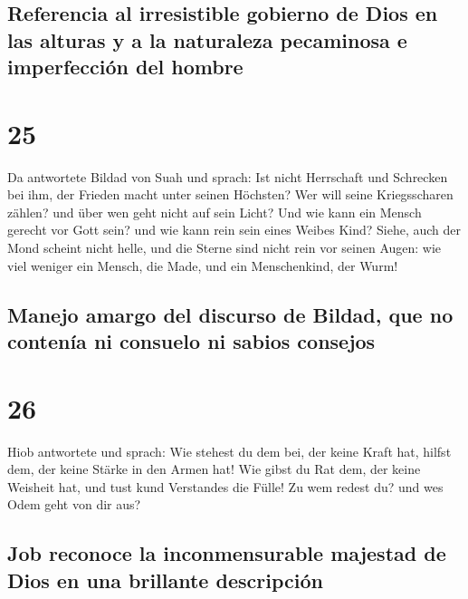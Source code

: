 \hypertarget{referencia-al-irresistible-gobierno-de-dios-en-las-alturas-y-a-la-naturaleza-pecaminosa-e-imperfecciuxf3n-del-hombre}{%
\subsection{Referencia al irresistible gobierno de Dios en las alturas y
a la naturaleza pecaminosa e imperfección del
hombre}\label{referencia-al-irresistible-gobierno-de-dios-en-las-alturas-y-a-la-naturaleza-pecaminosa-e-imperfecciuxf3n-del-hombre}}

\hypertarget{section-24}{%
\section{25}\label{section-24}}

 Da antwortete Bildad von Suah und sprach: 
Ist nicht Herrschaft und Schrecken bei ihm, der Frieden macht unter
seinen Höchsten?  Wer will seine Kriegsscharen zählen? und
über wen geht nicht auf sein Licht?  Und wie kann ein
Mensch gerecht vor Gott sein? und wie kann rein sein eines Weibes Kind?
 Siehe, auch der Mond scheint nicht helle, und die Sterne
sind nicht rein vor seinen Augen:  wie viel weniger ein
Mensch, die Made, und ein Menschenkind, der Wurm!

\hypertarget{manejo-amargo-del-discurso-de-bildad-que-no-contenuxeda-ni-consuelo-ni-sabios-consejos}{%
\subsection{Manejo amargo del discurso de Bildad, que no contenía ni
consuelo ni sabios
consejos}\label{manejo-amargo-del-discurso-de-bildad-que-no-contenuxeda-ni-consuelo-ni-sabios-consejos}}

\hypertarget{section-25}{%
\section{26}\label{section-25}}

 Hiob antwortete und sprach:  Wie stehest du
dem bei, der keine Kraft hat, hilfst dem, der keine Stärke in den Armen
hat!  Wie gibst du Rat dem, der keine Weisheit hat, und
tust kund Verstandes die Fülle!  Zu wem redest du? und wes
Odem geht von dir aus?

\hypertarget{job-reconoce-la-inconmensurable-majestad-de-dios-en-una-brillante-descripciuxf3n}{%
\subsection{Job reconoce la inconmensurable majestad de Dios en una
brillante
descripción}\label{job-reconoce-la-inconmensurable-majestad-de-dios-en-una-brillante-descripciuxf3n}}

